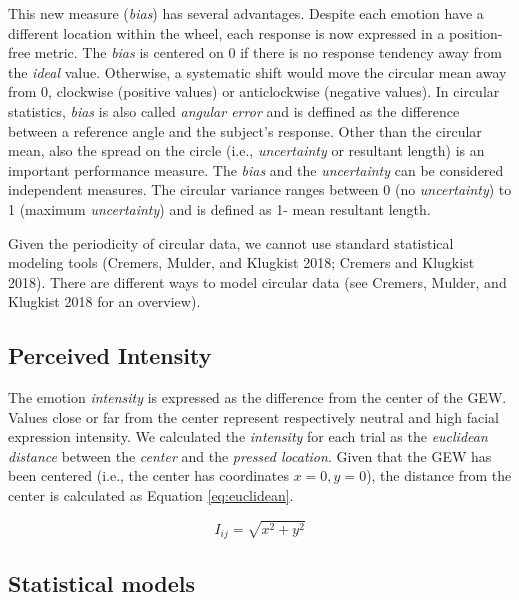 \documentclass[
]{article}
\begin{document}
This new measure (\emph{bias}) has several advantages. Despite each emotion have a different location within the wheel, each response is now expressed in a position-free metric. The \emph{bias} is centered on 0 if there is no response tendency away from the \emph{ideal} value. Otherwise, a systematic shift would move the circular mean away from 0, clockwise (positive values) or anticlockwise (negative values). In circular statistics, \emph{bias} is also called \emph{angular error} and is deffined as the difference between a reference angle and the subject's response. Other than the circular mean, also the spread on the circle (i.e., \emph{uncertainty} or resultant length) is an important performance measure. The \emph{bias} and the \emph{uncertainty} can be considered independent measures. The circular variance ranges between 0 (no \emph{uncertainty}) to 1 (maximum \emph{uncertainty}) and is defined as 1- mean resultant length.

Given the periodicity of circular data, we cannot use standard statistical modeling tools (Cremers, Mulder, and Klugkist 2018; Cremers and Klugkist 2018). There are different ways to model circular data (see Cremers, Mulder, and Klugkist 2018 for an overview).

\hypertarget{perceived-intensity}{%
\subsection{Perceived Intensity}\label{perceived-intensity}}

The emotion \emph{intensity} is expressed as the difference from the center of the GEW. Values close or far from the center represent respectively neutral and high facial expression intensity. We calculated the \emph{intensity} for each trial as the \emph{euclidean distance} between the \emph{center} and the \emph{pressed location}. Given that the GEW has been centered (i.e., the center has coordinates \(x = 0,y = 0\)), the distance from the center is calculated as Equation \eqref{eq:euclidean}.

\begin{equation}
I_{ij} = \sqrt{x^2 + y^2} 
\label{eq:euclidean}
\end{equation}

\hypertarget{statistical-models}{%
\subsection{Statistical models}\label{statistical-models}}
\end{document}
